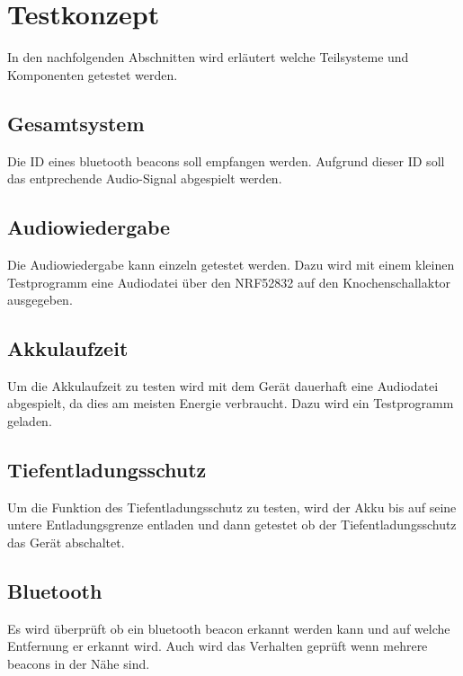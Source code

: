 \section{Testkonzept}
In den nachfolgenden Abschnitten wird erläutert welche Teilsysteme und Komponenten getestet werden.

\subsection{Gesamtsystem}
Die ID eines bluetooth beacons soll empfangen werden. Aufgrund dieser ID soll das entprechende Audio-Signal abgespielt werden. 

\subsection{Audiowiedergabe}
Die Audiowiedergabe kann einzeln getestet werden. Dazu wird mit einem kleinen Testprogramm eine Audiodatei über den NRF52832 auf den Knochenschallaktor ausgegeben. 

\subsection{Akkulaufzeit}
Um die Akkulaufzeit zu testen wird mit dem Gerät dauerhaft eine Audiodatei abgespielt, da dies am meisten Energie verbraucht. Dazu wird ein Testprogramm geladen.

\subsection{Tiefentladungsschutz}
Um die Funktion des Tiefentladungsschutz zu testen, wird der Akku bis auf seine untere Entladungsgrenze entladen und dann getestet ob der Tiefentladungsschutz das Gerät abschaltet.

\subsection{Bluetooth}
Es wird überprüft ob ein bluetooth beacon erkannt werden kann und auf welche Entfernung er erkannt wird. Auch wird das Verhalten geprüft wenn mehrere beacons in der Nähe sind.